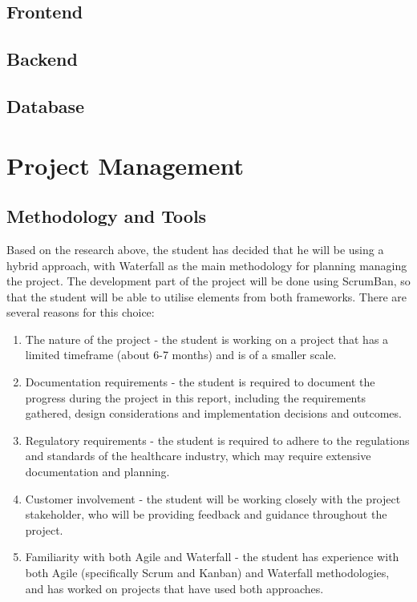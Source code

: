 \subsection{Frontend}

\subsection{Backend}

\subsection{Database}

\section{Project Management}

\subsection{Methodology and Tools}

Based on the research above, the student has decided that he will be using a hybrid approach, with Waterfall as the main methodology for planning managing the project. The development part of the project will be done using ScrumBan, so that the student will be able to utilise elements from both frameworks. There are several reasons for this choice:

\begin{enumerate}
    \item The nature of the project - the student is working on a project that has a limited timeframe (about 6-7 months) and is of a smaller scale. 
    \item Documentation requirements - the student is required to document the progress during the project in this report, including the requirements gathered, design considerations and implementation decisions and outcomes. 
    \item Regulatory requirements - the student is required to adhere to the regulations and standards of the healthcare industry, which may require extensive documentation and planning.
    \item Customer involvement - the student will be working closely with the project stakeholder, who will be providing feedback and guidance throughout the project.
    \item Familiarity with both Agile and Waterfall - the student has experience with both Agile (specifically Scrum and Kanban) and Waterfall methodologies, and has worked on projects that have used both approaches.
\end{enumerate}


